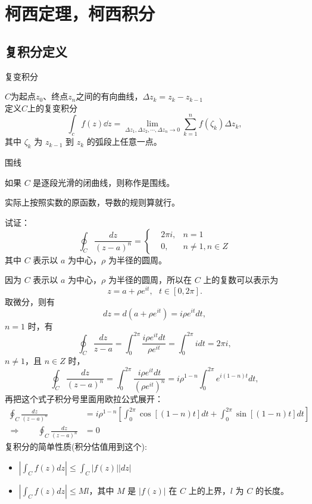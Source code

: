 \documentclass[cn,hazy,blue,14pt,normal]{elegantnote}
\numberwithin{equation}{section}
\begin{document}
\newpage
\section{柯西定理，柯西积分}
\newpage
\subsection{复积分定义}
\begin{definition}
	复变积分
\end{definition}

$C$为起点$z_0$、终点$z_n$之间的有向曲线，$\Delta z_k = z_k - z_{k-1}$\\
定义$C$上的复变积分
$$
\int_c f(z) \dd z = \lim_{\Delta z_1, \Delta z_2, \cdots, \Delta z_n \rightarrow 0} \sum^n_{k=1} f(\zeta_k) \Delta z_k,
$$
其中 $\zeta_k$ 为 $z_{k-1}$ 到 $z_k$ 的弧段上任意一点。

\begin{definition}
	围线
\end{definition}

如果 $C$ 是逐段光滑的闭曲线，则称作是围线。
\begin{note}
	实际上按照实数的原函数，导数的规则算就行。
\end{note}
\begin{example}
试证：
$$
\oint_C \frac{ dz }{ (z-a)^n } = \left\{
\begin{aligned}
& 2\pi i, & n=1 \\
& 0, & n\neq 1, n\in Z
\end{aligned}
\right.
$$
其中 $C$ 表示以 $a$ 为中心，$\rho$ 为半径的圆周。
\end{example}

因为 $C$ 表示以 $a$ 为中心，$\rho$ 为半径的圆周，所以在 $C$ 上的复数可以表示为
$$
z = a+\rho e^{it}, ~~~ t \in [0,2\pi].
$$
取微分，则有
$$
dz = d(a+\rho e^{it}) = i\rho e^{it} dt,
$$
$n=1$ 时，有
$$
\oint_C \frac{dz}{z-a} = \int^{2\pi}_0 \frac{ i\rho e^{it} dt}{\rho e^{it}} = \int^{2\pi}_0 idt = 2\pi i,
$$
$n\neq 1$，且 $n\in Z$ 时，
$$
\oint_C \frac{dz}{(z-a)^n} = \int^{2\pi}_0 \frac{ i\rho e^{it} dt}{(\rho e^{it})^n} = i \rho^{1-n} \int^{2\pi}_0 e^{i(1-n)t}dt,
$$
再把这个式子积分号里面用欧拉公式展开：
$$
\begin{aligned}
	\oint_C \frac{dz}{(z-a)^n} &= i \rho^{1-n} \left[ \int^{2\pi}_0 \cos[(1-n)t] dt + \int^{2\pi}_0 \sin[(1-n)t] dt\right]\\
	\Rightarrow \qquad \oint_C \frac{dz}{(z-a)^n} &= 0
\end{aligned}
$$
复积分的简单性质(积分估值用到这个):
\begin{itemize}
	\item $|\int_C f(z) dz | \leq \int_C |f(z)| |dz|$
	\item $|\int_C f(z) dz | \leq Ml$，其中 $M$ 是 $|f(z)|$ 在 $C$ 上的上界，$l$ 为 $C$ 的长度。
\end{itemize}
\end{document}
